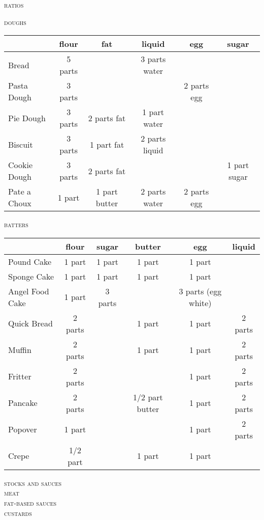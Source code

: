 \documentclass[letterpaper,11pt]{article}
\newcommand{\sectionheader}[1]{
    \vspace{1.2em}
    {\small\textsc{#1}} \\
}
\begin{document}
\normalsize

{\huge\scshape{ratios}}


\sectionheader{doughs}
\begin{tabular}{ l c c c c c }
\rowcolor{white}
~ & flour & fat & liquid & egg & sugar \\
\hline
Bread & 5 parts & & 3 parts water & & \\
Pasta Dough & 3 parts & & & 2 parts egg & \\
Pie Dough & 3 parts & 2 parts fat & 1 part water & & \\
Biscuit & 3 parts & 1 part fat & 2 parts liquid & & \\
Cookie Dough & 3 parts & 2 parts fat & & & 1 part sugar \\
Pate a Choux & 1 part & 1 part butter & 2 parts water & 2 parts egg & \\
\end{tabular}

\sectionheader{batters}
\begin{tabular}{ l c c c c c }
\rowcolor{white}
~ & flour & sugar & butter & egg & liquid \\
\hline
Pound Cake & 1 part & 1 part & 1 part & 1 part & \\
Sponge Cake & 1 part & 1 part & 1 part & 1 part & \\
Angel Food Cake & 1 part & 3 parts & & 3 parts (egg white) & \\
Quick Bread & 2 parts & & 1 part & 1 part & 2 parts \\
Muffin & 2 parts & & 1 part & 1 part & 2 parts \\
Fritter & 2 parts & & & 1 part & 2 parts \\
Pancake & 2 parts & & 1/2 part butter & 1 part & 2 parts \\
Popover & 1 part & & & 1 part & 2 parts \\
Crepe & 1/2 part & & 1 part & 1 part \\
\end{tabular}

\sectionheader{stocks and sauces}
\sectionheader{meat}
\sectionheader{fat-based sauces}
\sectionheader{custards}
\end{document}
